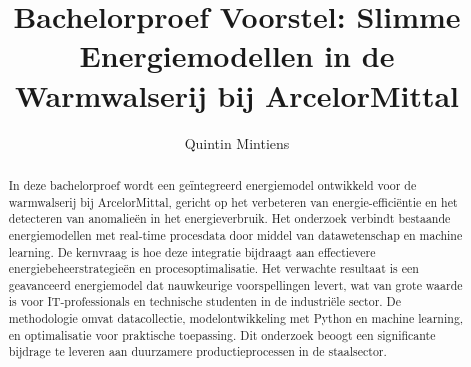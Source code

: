 \documentclass{hogent-article}
\title{Bachelorproef Voorstel: Slimme Energiemodellen in de Warmwalserij bij ArcelorMittal}
\author{Quintin Mintiens}
\begin{document}
\begin{abstract}
  
In deze bachelorproef wordt een geïntegreerd energiemodel ontwikkeld voor de warmwalserij bij ArcelorMittal, gericht op het verbeteren van energie-efficiëntie en het detecteren van anomalieën in het energieverbruik. Het onderzoek verbindt bestaande energiemodellen met real-time procesdata door middel van datawetenschap en machine learning. De kernvraag is hoe deze integratie bijdraagt aan effectievere energiebeheerstrategieën en procesoptimalisatie. Het verwachte resultaat is een geavanceerd energiemodel dat nauwkeurige voorspellingen levert, wat van grote waarde is voor IT-professionals en technische studenten in de industriële sector. De methodologie omvat datacollectie, modelontwikkeling met Python en machine learning, en optimalisatie voor praktische toepassing. Dit onderzoek beoogt een significante bijdrage te leveren aan duurzamere productieprocessen in de staalsector.
\end{abstract}

\tableofcontents



\printbibliography[heading=bibintoc]
\end{document}
